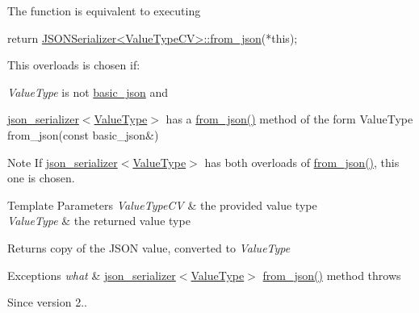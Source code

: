 The function is equivalent to executing 
\begin{DoxyCode}
\textcolor{keywordflow}{return} \hyperlink{namespacenlohmann_1_1anonymous__namespace_02from__json_8hpp_03_a8da2cbc27f4ff99aff5c20428fbcce4c}{JSONSerializer<ValueTypeCV>::from\_json}(*\textcolor{keyword}{this});
\end{DoxyCode}


This overloads is chosen if\+:
\begin{DoxyItemize}
\item {\itshape Value\+Type} is not \hyperlink{classnlohmann_1_1basic__json}{basic\+\_\+json} and
\item \hyperlink{classnlohmann_1_1basic__json_a7768841baaaa7a21098a401c932efaff}{json\+\_\+serializer$<$\+Value\+Type$>$} has a {\ttfamily \hyperlink{namespacenlohmann_1_1anonymous__namespace_02from__json_8hpp_03_a8da2cbc27f4ff99aff5c20428fbcce4c}{from\+\_\+json()}} method of the form {\ttfamily Value\+Type from\+\_\+json(const basic\+\_\+json\&)}
\end{DoxyItemize}

\begin{DoxyNote}{Note}
If \hyperlink{classnlohmann_1_1basic__json_a7768841baaaa7a21098a401c932efaff}{json\+\_\+serializer$<$\+Value\+Type$>$} has both overloads of {\ttfamily \hyperlink{namespacenlohmann_1_1anonymous__namespace_02from__json_8hpp_03_a8da2cbc27f4ff99aff5c20428fbcce4c}{from\+\_\+json()}}, this one is chosen.
\end{DoxyNote}

\begin{DoxyTemplParams}{Template Parameters}
{\em Value\+Type\+CV} & the provided value type \\
\hline
{\em Value\+Type} & the returned value type\\
\hline
\end{DoxyTemplParams}
\begin{DoxyReturn}{Returns}
copy of the J\+S\+ON value, converted to {\itshape Value\+Type} 
\end{DoxyReturn}

\begin{DoxyExceptions}{Exceptions}
{\em what} & \hyperlink{classnlohmann_1_1basic__json_a7768841baaaa7a21098a401c932efaff}{json\+\_\+serializer$<$\+Value\+Type$>$} {\ttfamily \hyperlink{namespacenlohmann_1_1anonymous__namespace_02from__json_8hpp_03_a8da2cbc27f4ff99aff5c20428fbcce4c}{from\+\_\+json()}} method throws\\
\hline
\end{DoxyExceptions}
\begin{DoxySince}{Since}
version 2.. 
\end{DoxySince}
